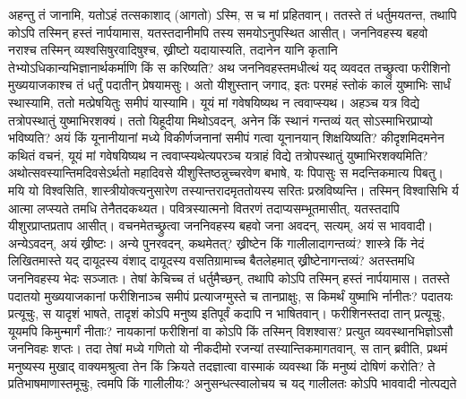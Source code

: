 \vakya अहन्तु तं जानामि, यतोऽहं तत्सकाशाद् (आगतो) ऽस्मि, स च मां प्रहितवान्।
\vakya ततस्ते तं धर्तुमयतन्त, तथापि कोऽपि तस्मिन् हस्तं नार्पयामास, यतस्तदानीमपि तस्य समयोऽनुपस्थित आसीत्।
\vakya जननिवहस्य बहवो नराश्च तस्मिन् व्यश्वसिषुरवादिषुश्च, ख्रीष्टो यदायास्यति, तदानेन यानि कृतानि तेभ्योऽधिकान्यभिज्ञानार्थकर्माणि किं स करिष्यति?
\vakya अथ जननिवहस्तमधीत्थं यद् व्यवदत तच्छ्रुत्वा फरीशिनो मुख्ययाजकाश्च तं धर्तुं पदातीन् प्रेषयामसुः।
\vakya अतो यीशुस्तान् जगाद, इतः परमहं स्तोकं कालं युष्माभिः सार्धं स्थास्यामि, ततो मत्प्रेषयितुः समीपं यास्यामि।
\vakya यूयं मां गवेषयिष्यथ न त्ववाप्स्यथ। अहञ्च यत्र विद्ये तत्रोपस्थातुं युष्माभिरशक्यं।
\vakya ततो यिहूदीया मिथोऽवदन्, अनेन किं स्थानं गन्तव्यं यत् सोऽस्माभिरप्राप्यो भविष्यति? अयं किं यूनानीयानां मध्ये विकीर्णजनानां समीपं गत्वा यूनानयान् शिक्षयिष्यति?
\vakya कीदृशमिदमनेन कथितं वचनं, यूयं मां गवेषयिष्यथ न त्ववाप्स्यथेत्यपरञ्च यत्राहं विद्ये तत्रोपस्थातुं युष्माभिरशक्यमिति?
\vakya अथोत्सवस्यान्तिमदिवसेऽर्थतो महादिवसे यीशुस्तिष्ठन्नुच्चरवेण बभाषे, यः पिपासुः स मदन्तिकमात्य पिबतु।
\vakya मयि यो विश्वसिति, शास्त्रीयोक्त्यनुसारेण तस्यान्तरादमृततोयस्य सरितः प्रस्रविष्यन्ति।
\vakya तस्मिन् विश्वासिभि र्य आत्मा लप्स्यते तमधि तेनैतदकथ्यत। पवित्रस्यात्मनो वितरणं तदाप्यसम्भूतमासीत्, यतस्तदापि यीशुरप्राप्तप्रताप आसीत्।
\vakya वचनमेतच्छ्रुत्वा जननिवहस्य बहवो जना अवदन्, सत्यम्, अयं स भाववादी।
\vakya अन्येऽवदन्, अयं ख्रीष्टः। अन्ये पुनरवदन्, कथमेतत्? ख्रीष्टेन किं गालीलादागन्तव्यं?
\vakya शास्त्रे किं नेदं लिखितमास्ते यद् दायूदस्य वंशाद् दायूदस्य वसतिग्रामाच्च बैतलेहमात् ख्रीष्टेनागन्तव्यं?
\vakya अतस्तमधि जननिवहस्य भेदः सञ्जातः।
\vakya तेषां केचिच्च तं धर्तुमैच्छन्, तथापि कोऽपि तस्मिन् हस्तं नार्पयामास।
\vakya ततस्ते पदातयो मुख्ययाजकानां फरीशिनाञ्च समीपं प्रत्याजग्मुस्ते च तानप्राक्षुः, स किमर्थं युष्माभि र्नानीतः?
\vakya पदातयः प्रत्यूचुः, स यादृशं भाषते, तादृशं कोऽपि मनुष्य इतिपूर्वं कदापि न भाषितवान्।
\vakya फरीशिनस्तदा तान् प्रत्यूचुः, यूयमपि किमुन्मार्गं नीताः?
\vakya नायकानां फरीशिनां वा कोऽपि किं तस्मिन् विशश्वास?
\vakya प्रत्युत व्यवस्थानभिज्ञोऽसौ जननिवहः शप्तः।
\vakya तदा तेषां मध्ये गणितो यो नीकदीमो रजन्यां तस्यान्तिकमागतवान्, स तान् ब्रवीति,
\vakya प्रथमं मनुष्यस्य मुखाद् वाक्यमश्रुत्वा तेन किं क्रियते तदज्ञात्वा वास्माकं व्यवस्था किं मनुष्यं दोषिणं करोति?
\vakya ते प्रतिभाषमाणास्तमूचुः, त्वमपि किं गालीलीयः? अनुसन्धत्स्वालोचय च यद् गालीलतः कोऽपि भाववादी नोत्पद्यते\eoc